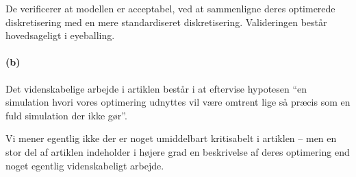 De verificerer at modellen er acceptabel, ved at sammenligne deres optimerede
diskretisering med en mere standardiseret diskretisering. Valideringen består
hovedsageligt i eyeballing.

\paragraph{(b)}
Det videnskabelige arbejde i artiklen består i at eftervise hypotesen ``en
simulation hvori vores optimering udnyttes vil være omtrent lige så præcis som
en fuld simulation der ikke gør''.

Vi mener egentlig ikke der er noget umiddelbart kritisabelt i artiklen -- men en
stor del af artiklen indeholder i højere grad en beskrivelse af deres optimering
end noget egentlig videnskabeligt arbejde.
